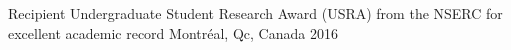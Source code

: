 \begin{cvhonors}
  \cvhonor
    {Recipient}
    {Undergraduate Student Research Award (USRA) from the NSERC for excellent academic record}
    {Montr\'eal, Qc, Canada}
    {2016}

\end{cvhonors}
